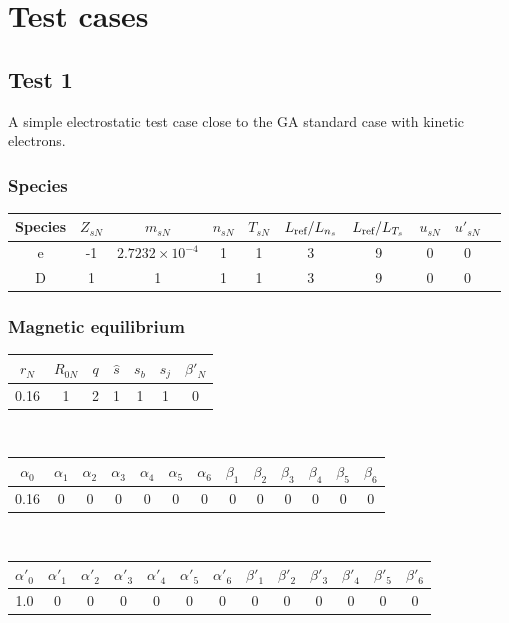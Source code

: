\documentclass[fleqn]{report}
\begin{document}
\chapter{Test cases}

\section{Test 1}
A simple electrostatic test case close to the GA standard case with kinetic electrons.
\subsection{Species}
\begin{tabular}{c c c c c c c c c c}
\hline
Species & $Z_{sN}$ & $m_{sN}$ & $n_{sN}$ & $T_{sN}$ & $L_{\textrm{ref}}/L_{n_s}$ & $L_{\textrm{ref}}/L_{T_s}$ & $u_{sN}$ & $u'_{sN}$ \\ [0.5ex]
\hline
e & -1 & $2.7232\times10^{-4}$ & 1 & 1 & 3 & 9 & 0 & 0 \\ [0.5ex]
\hline 
D &  1 & 1 & 1 & 1 & 3 & 9 & 0 & 0 \\ [0.5ex]
\hline
\end{tabular}

\subsection{Magnetic equilibrium}
\begin{tabular}{c c c c c c c}
\hline
$r_N$ & $R_{0N}$ & $q$ & $\hat{s}$ & $s_b$ & $s_j$ & $\beta'_N$ \\ [0.5ex]
\hline
0.16 & 1 & 2 & 1 & 1 & 1 & 0 \\
\hline
\end{tabular}\\
\begin{tabular}{c c c c c c c c c c c c c}
\hline
$\alpha_0$ & $\alpha_1$ & $\alpha_2$ & $\alpha_3$ & $\alpha_4$ & $\alpha_5$ & $\alpha_6$ 
& $\beta_1$ & $\beta_2$ & $\beta_3$ & $\beta_4$ & $\beta_5$ & $\beta_6$   \\ [0.5ex]
\hline
 0.16 & 0 & 0 & 0 & 0 & 0 & 0 & 0 & 0 & 0 & 0 & 0 & 0 \\
\hline
\end{tabular}\\
\begin{tabular}{c c c c c c c c c c c c c}
\hline
$\alpha'_0$ & $\alpha'_1$ & $\alpha'_2$ & $\alpha'_3$ & $\alpha'_4$ & $\alpha'_5$ & $\alpha'_6$ 
& $\beta'_1$ & $\beta'_2$ & $\beta'_3$ & $\beta'_4$ & $\beta'_5$ & $\beta'_6$   \\ [0.5ex]
\hline
1.0 & 0 & 0 & 0 & 0 & 0  & 0 & 0 & 0 & 0  & 0 & 0 & 0 \\
\hline
\end{tabular}
\end{document}
